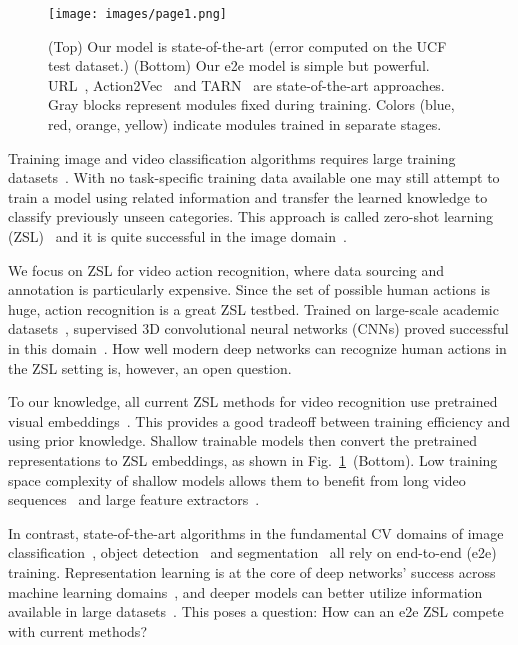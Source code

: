 \documentclass[10pt,twocolumn,letterpaper]{article}
\begin{document}
\begin{figure}
\centering
\texttt{[image: images/page1.png]}
\caption{(Top) Our model is state-of-the-art (error computed on the UCF test dataset.) (Bottom) Our e2e model is simple but powerful. URL~\cite{uar}, Action2Vec~\cite{action2vec} and TARN~\cite{tarn} are state-of-the-art approaches. Gray blocks represent modules fixed during training. Colors (blue, red, orange, yellow) indicate modules trained in separate stages.}
\label{fig:page1}
\end{figure}

Training image and video classification algorithms requires large training datasets~\cite{resnet,alexnet,c3d,r2plus1d,tsn}. With no task-specific training data available one may still attempt to train a model using related information and transfer the learned knowledge to classify previously unseen categories. This approach is called zero-shot learning (ZSL)~\cite{larochelle2008zero, palatucci2009zero} and it is quite successful in the image domain~\cite{mic, roth2020revisiting, DenseposeEvo20,dcesml,facenet,xian2017zero}.

We focus on ZSL for video action recognition, where data sourcing and annotation is particularly expensive. Since the set of possible human actions is huge, action recognition is a great ZSL testbed. Trained on large-scale academic datasets~\cite{activitynet,smtsmt,sports1m,kinetics,hmdb,ucf}, supervised 3D convolutional neural networks (CNNs) proved successful in this domain~\cite{slowfast,c3d,r2plus1d}. How well modern deep networks can recognize human actions in the ZSL setting is, however, an open question.

To our knowledge, all current ZSL methods for video recognition use pretrained visual embeddings~\cite{alexiou2016exploring, tarn,action2vec, mishra2018generative, piergiovanni2018learning, wang2017alternative, wang2017zero, xu2015semantic, xu2017transductive, xu2016multi, zhang2018cross, uar}. This provides a good tradeoff between training efficiency and using prior knowledge. Shallow trainable models then convert the pretrained representations to ZSL embeddings, as shown in Fig.~\ref{fig:page1}~(Bottom). Low training space complexity of shallow models allows them to benefit from long video sequences~\cite{c3d} and large feature extractors~\cite{resnet}. 

In contrast, state-of-the-art algorithms in the fundamental CV domains of image classification~\cite{resnet}, object detection~\cite{yolo,rcnn,sniper} and segmentation~\cite{deeplab,maskrcnn,pspnet} all rely on end-to-end (e2e) training. Representation learning is at the core of deep networks' success across machine learning domains~\cite{representation}, and deeper models can better utilize information available in large datasets~\cite{lots_of_data,resnet}. This poses a question: How can an e2e ZSL compete with current methods?
\end{document}
